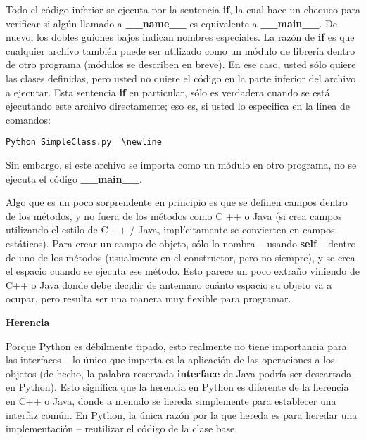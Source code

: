 Todo el código inferior se ejecuta por la sentencia \textbf{if}, la cual hace un chequeo para verificar si algún llamado a \textbf{\_\_name\_\_} es equivalente a \textbf{\_\_main\_\_}. De nuevo, los dobles guiones bajos indican nombres especiales. La razón de \textbf{if} es que cualquier archivo también puede ser utilizado como un módulo de librería dentro de otro programa (módulos se describen en breve). En ese caso, usted sólo quiere las clases definidas, pero usted no quiere el código en la parte inferior del archivo a ejecutar. Esta sentencia \textbf{if} en particular, sólo es verdadera cuando se está ejecutando este archivo directamente; eso es, si usted lo especifica en la línea de comandos: \newline

\begin{lstlisting}
Python SimpleClass.py  \newline 
\end{lstlisting}

Sin embargo, si este archivo se importa como un módulo en otro programa, no se ejecuta el código \textbf{\_\_main\_\_}. \newline

Algo que es un poco sorprendente en principio es que se definen campos dentro de los métodos, y no fuera de los métodos como C ++ o Java (si crea campos utilizando el estilo de C ++ / Java, implícitamente se convierten en campos estáticos). Para crear un campo de objeto, sólo lo nombra – usando \textbf{self} – dentro de uno de los métodos (usualmente en el constructor, pero no siempre), y se crea el espacio cuando se ejecuta ese método. %
Esto parece un poco extraño viniendo de C++ o Java donde debe decidir de antemano cuánto espacio su objeto va a ocupar, pero resulta ser una manera muy flexible para programar.  \newline

\textbf{Herencia} \newline

Porque Python es débilmente tipado, esto realmente no tiene importancia para las interfaces – lo único que importa es la aplicación de las operaciones a los objetos (de hecho, la palabra reservada \textbf{interface} de Java podría ser descartada en Python). Esto significa que la herencia en Python es diferente de la herencia en C++ o Java, donde a menudo se hereda simplemente para establecer una interfaz común. En Python, la única razón por la que hereda es para heredar una implementación – reutilizar el código de la clase base. \newline

